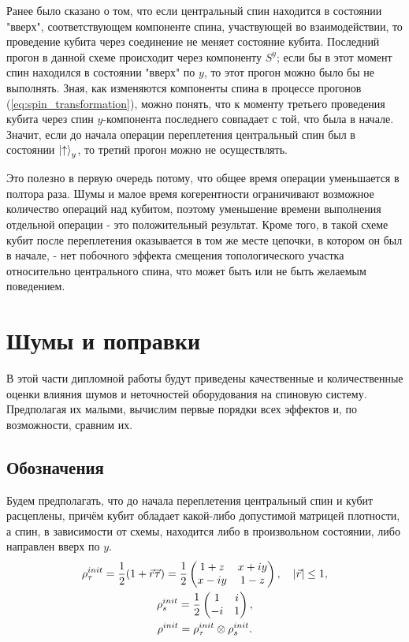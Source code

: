 \documentclass[a4paper,12pt]{article}
\theoremstyle{plain} %
\theoremstyle{definition} %
\theoremstyle{remark} %
\begin{document}
Ранее было сказано о том, что если центральный спин находится в состоянии "вверх"$ $, соответствующем компоненте спина, участвующей во взаимодействии, то проведение кубита через соединение не меняет состояние кубита. Последний прогон в данной схеме происходит через компоненту $S^y$; если бы в этот момент спин находился в состоянии "вверх"$ $ по $y$, то этот прогон можно было бы не выполнять. Зная, как изменяются компоненты спина в процессе прогонов (\ref{eq:spin_transformation}), можно понять, что к моменту третьего проведения кубита через спин $y$-компонента последнего совпадает с той, что была в начале. Значит, если до начала операции переплетения центральный спин был в состоянии $\ket{\uparrow}_y$, то третий прогон можно не осуществлять.

Это полезно в первую очередь потому, что общее время операции уменьшается в полтора раза. Шумы и малое время когерентности ограничивают возможное количество операций над кубитом, поэтому уменьшение времени выполнения отдельной операции - это положительный результат. Кроме того, в такой схеме кубит после переплетения оказывается в том же месте цепочки, в котором он был в начале, - нет побочного эффекта смещения топологического участка относительно центрального спина, что может быть или не быть желаемым поведением.

\pagebreak

\section{Шумы и поправки}

В этой части дипломной работы будут приведены качественные и количественные оценки влияния шумов и неточностей оборудования на спиновую систему. Предполагая их малыми, вычислим первые порядки всех эффектов и, по возможности, сравним их.

\subsection{Обозначения}

Будем предполагать, что до начала переплетения центральный спин и кубит расцеплены, причём кубит обладает какой-либо допустимой матрицей плотности, а спин, в зависимости от схемы, находится либо в произвольном состоянии, либо направлен вверх по $y$.
\begin{gather}
    \rho_\tau^{init} = \frac{1}{2} (1 + \vec{r}\vec{\tau}) = \frac{1}{2}
    \begin{pmatrix}
        1 + z & x + i y \\
        x - i y & 1 - z
    \end{pmatrix}, \quad \abs{\vec{r}} \le 1,
    \\
    \rho_s^{init} = \frac{1}{2} \begin{pmatrix}
        1 & i \\
        -i & 1
    \end{pmatrix},
    \\
    \rho^{init} = \rho_\tau^{init} \otimes \rho_s^{init}.
\end{gather}
\end{document}

